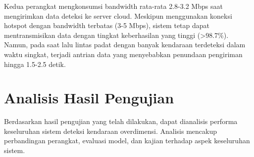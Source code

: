 Kedua perangkat mengkonsumsi bandwidth rata-rata 2.8-3.2 Mbps saat mengirimkan data deteksi ke server cloud. Meskipun menggunakan koneksi hotspot dengan bandwidth terbatas (3-5 Mbps), sistem tetap dapat mentransmisikan data dengan tingkat keberhasilan yang tinggi (>98.7\%). Namun, pada saat lalu lintas padat dengan banyak kendaraan terdeteksi dalam waktu singkat, terjadi antrian data yang menyebabkan penundaan pengiriman hingga 1.5-2.5 detik.





\section{Analisis Hasil Pengujian}
\label{sec:analisis}

Berdasarkan hasil pengujian yang telah dilakukan, dapat dianalisis performa keseluruhan sistem deteksi kendaraan overdimensi. Analisis mencakup perbandingan perangkat, evaluasi model, dan kajian terhadap aspek keseluruhan sistem.

